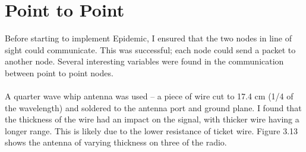 \documentclass[12pt,a4paper]{report}
\begin{document}
\section{Point to Point}
Before starting to implement Epidemic, I ensured that the two nodes in line of sight could communicate. This was successful; each node could send a packet to another node. Several interesting variables were found in the communication between point to point nodes. \\ \\
A quarter wave whip antenna was used -- a piece of wire cut to 17.4 cm (1/4 of the wavelength) and soldered to the antenna port and ground plane. I found that the thickness of the wire had an impact on the signal, with thicker wire having a longer range. This is likely due to the lower resistance of ticket wire. Figure 3.13 shows the antenna of varying thickness on three of the radio. 
\end{document}
